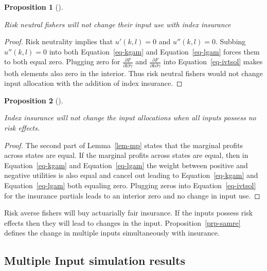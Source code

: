 \documentclass[
  letterpaper,
  DIV=11,
  numbers=noendperiod]{scrartcl}
\theoremstyle{plain}
\newtheorem{proposition}{Proposition}[section]
\theoremstyle{plain}
\theoremstyle{remark}
\begin{document}
\begin{proposition}[]\protect\hypertarget{prp-rn}{}\label{prp-rn}

Risk neutral fishers will not change their input use with index
insurance

\end{proposition}

\begin{proof}

Risk neutrality implies that \(u'(k,l)=0\) and \(u''(k,l)=0\). Subbing
\(u''(k,l)=0\) into both Equation~\ref{eq-kgam} and
Equation~\ref{eq-lgam} forces them to both equal zero. Plugging zero for
\(\frac{\partial F}{\partial l \partial \gamma}\) and
\(\frac{\partial F}{\partial k \partial \gamma}\) into
Equation~\ref{eq-ivtsol} makes both elements also zero in the interior.
Thus risk neutral fishers would not change input allocation with the
addition of index insurance.

\end{proof}

\begin{proposition}[]\protect\hypertarget{prp-rezero}{}\label{prp-rezero}

Index insurance will not change the input allocations when all inputs
possess no risk effects.

\end{proposition}

\begin{proof}

The second part of Lemma~\ref{lem-mp} states that the marginal profits
across states are equal. If the marginal profits across states are
equal, then in Equation~\ref{eq-kgam} and Equation~\ref{eq-lgam} the
weight between positive and negative utilities is also equal and cancel
out leading to Equation~\ref{eq-kgam} and Equation~\ref{eq-lgam} both
equaling zero. Plugging zeros into Equation~\ref{eq-ivtsol} for the
insurance partials leads to an interior zero and no change in input use.

\end{proof}

Risk averse fishers will buy actuarially fair insurance. If the inputs
possess risk effects then they will lead to changes in the input.
Proposition~\ref{prp-samre} defines the change in multiple inputs
simultaneously with insurance.

\hypertarget{sec-simres}{%
\subsection{Multiple Input simulation results}\label{sec-simres}}
\end{document}
